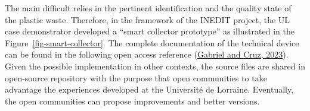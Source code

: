 \documentclass[
  11pt,
]{article}
\begin{document}
The main difficult relies in the pertinent identification and the
quality state of the plastic waste. Therefore, in the framework of the
INEDIT project, the UL case demonstrator developed a ``smart collector
prototype'' as illustrated in the Figure~\ref{fig-smart-collector}. The
complete documentation of the technical device can be found in the
following open access reference
(\protect\hyperlink{ref-gabriel2023}{Gabriel and Cruz, 2023}). Given the
possible implementation in other contexts, the source files are shared
in open-source repository with the purpose that open communities to take
advantage the experiences developed at the Université de Lorraine.
Eventually, the open communities can propose improvements and better
versions.

\begin{figure}

\begin{minipage}[t]{\linewidth}

{\centering 


}
\end{minipage}
\end{figure}
\end{document}
